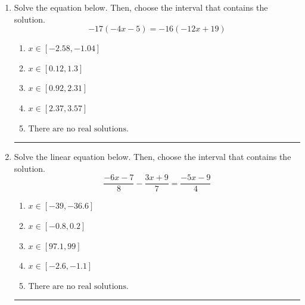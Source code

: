 \documentclass[14pt]{extbook}
\newcommand{\litem}[1]{\item#1\hspace*{-1cm}\rule{\textwidth}{0.4pt}}
\begin{document}
\begin{enumerate}
{\begin{enumerate}[label=\Alph*.]
\end{enumerate} }
\litem{
Solve the equation below. Then, choose the interval that contains the solution.\[ -17(-4x -5) = -16(-12x + 19) \]\begin{enumerate}[label=\Alph*.]
\item \( x \in [-2.58, -1.04] \)
\item \( x \in [0.12, 1.3] \)
\item \( x \in [0.92, 2.31] \)
\item \( x \in [2.37, 3.57] \)
\item \( \text{There are no real solutions.} \)

\end{enumerate} }
\litem{
Solve the linear equation below. Then, choose the interval that contains the solution.\[ \frac{-6x -7}{8} - \frac{3x + 9}{7} = \frac{-5x -9}{4} \]\begin{enumerate}[label=\Alph*.]
\item \( x \in [-39, -36.6] \)
\item \( x \in [-0.8, 0.2] \)
\item \( x \in [97.1, 99] \)
\item \( x \in [-2.6, -1.1] \)
\item \( \text{There are no real solutions.} \)


\end{enumerate}}
\end{enumerate}
\end{document}
